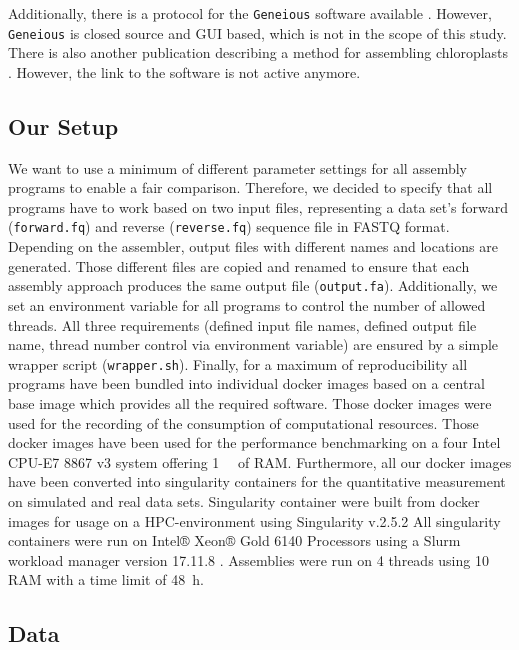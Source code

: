 \documentclass{bmcart}
\begin{document}
Additionally, there is a protocol for the \texttt{Geneious} \cite{geneious} software available \cite{geneious-protocol}.
However, \texttt{Geneious} is closed source and GUI based, which is not in the scope of this study.
There is also another publication describing a method for assembling chloroplasts \cite{method-description-paper}.
However, the link to the software is not active anymore.

\subsection*{Our Setup}
We want to use a minimum of different parameter settings for all assembly programs to enable a fair comparison. 
Therefore, we decided to specify that all programs have to work based on two input files, representing a data set's forward (\texttt{forward.fq}) and reverse  (\texttt{reverse.fq}) sequence file in FASTQ format.
Depending on the assembler, output files with different names and locations are generated.
Those different files are copied and renamed to ensure that each assembly approach produces the same output file (\texttt{output.fa}). 
Additionally, we set an environment variable for all programs to control the number of allowed threads.
All three requirements (defined input file names, defined output file name, thread number control via environment variable) are ensured by a simple wrapper script (\texttt{wrapper.sh}).
Finally, for a maximum of reproducibility all programs have been bundled into individual docker images based on a central base image which provides all the required software. Those docker images were used for the recording of the consumption of computational resources.
Those docker images have been used for the performance benchmarking on a four Intel CPU-E7 8867 v3 system offering \SI{1}{\tera\byte} of RAM.
Furthermore, all our docker images have been converted into singularity containers for the quantitative measurement on simulated and real data sets.
Singularity container were built from docker images for usage on a HPC-environment using Singularity v.2.5.2 \cite{kurtzer2017singularity}
All singularity containers were run on %
Intel® Xeon® Gold \num{6140} Processors using a Slurm workload manager version 17.11.8 \cite{Jette02slurm}. Assemblies were run on \num{4} threads using \SI{10}{\gibi\byte} RAM with a time limit of \SI{48}{\hour}.
\subsection*{Data}
\end{document}

